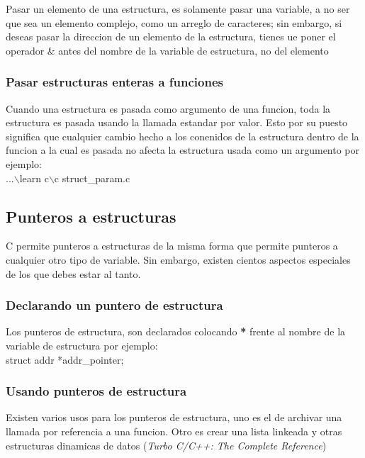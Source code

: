 \documentclass[]{article}
\begin{document}
				Pasar un elemento de una estructura, es solamente pasar una variable, a no ser que sea un elemento complejo, como un arreglo de caracteres; sin embargo, si deseas pasar la direccion de un elemento de la estructura, tienes ue poner el operador \& antes del nombre de la variable de estructura, no del elemento
				
				\subsubsection{Pasar estructuras enteras a funciones}
				
				Cuando una estructura es pasada como argumento de una funcion, toda la estructura es pasada usando la llamada estandar por valor. Esto por su puesto significa que cualquier cambio hecho a los conenidos de la estructura dentro de la funcion a la cual es pasada no afecta la estructura usada como un argumento por ejemplo:\\
				
				...$\backslash$learn c$\backslash$c struct\_param.c\\
				
			\subsection{Punteros a estructuras}
			
			C permite punteros a estructuras de la misma forma que permite punteros a cualquier otro tipo de variable. Sin embargo, existen cientos aspectos especiales de los que debes estar al tanto.
			
				\subsubsection{Declarando un puntero de estructura}
				
				Los punteros de estructura, son declarados colocando \textbf{*} frente al nombre de la variable de estructura por ejemplo:\\
				
				struct addr *addr\_pointer;\\
				
				\subsubsection{Usando punteros de estructura}
				
				Existen varios usos para los punteros de estructura, uno es el de archivar una llamada por referencia a una funcion. Otro es crear una lista linkeada y otras estructuras dinamicas de datos (\textit{Turbo C/C++: The Complete Reference})
				
\end{document}
